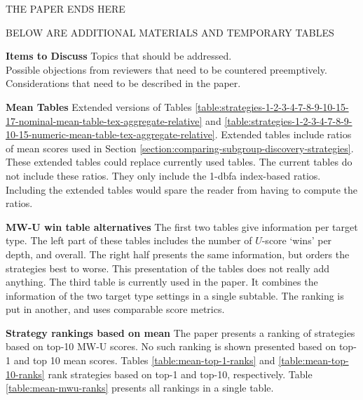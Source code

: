 \documentclass[smallextended]{svjour3}
\newcommand{\dbfa}[1]{1-dbfa}
\begin{document}
\clearpage
\pagebreak

\hspace{0pt}
\vfill

\centerline{THE PAPER ENDS HERE}
\centerline{BELOW ARE ADDITIONAL MATERIALS AND TEMPORARY TABLES}

\textbf{Items to Discuss}
Topics that should be addressed.\\
Possible objections from reviewers that need to be countered preemptively.\\
Considerations that need to be described in the paper.

\textbf{Mean Tables}
Extended versions of Tables \ref{table:strategies-1-2-3-4-7-8-9-10-15-17-nominal-mean-table-tex-aggregate-relative} and \ref{table:strategies-1-2-3-4-7-8-9-10-15-numeric-mean-table-tex-aggregate-relative}.
Extended tables include ratios of mean scores used in Section \ref{section:comparing-subgroup-discovery-strategies}.
These extended tables could replace currently used tables.
The current tables do not include these ratios.
They only include the \dbfa{0} index-based ratios.
Including the extended tables would spare the reader from having to compute the ratios.

\textbf{MW-U win table alternatives}
The first two tables give information per target type.
The left part of these tables includes the number of $U$-score `wins' per depth, and overall.
The right half presents the same information, but orders the strategies best to worse.
This presentation of the tables does not really add anything.
The third table is currently used in the paper.
It combines the information of the two target type settings in a single subtable.
The ranking is put in another, and uses comparable score metrics.

\textbf{Strategy rankings based on mean}
The paper presents a ranking of strategies based on top-10 MW-U scores.
No such ranking is shown presented based on top-1 and top 10 mean scores.
Tables \ref{table:mean-top-1-ranks} and \ref{table:mean-top-10-ranks} rank strategies based on top-1 and top-10, respectively.
Table \ref{table:mean-mwu-ranks} presents all rankings in a single table.


\vfill

\clearpage
\pagebreak
\end{document}
